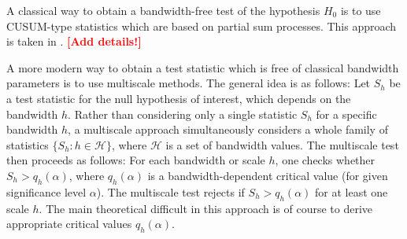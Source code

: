 \documentclass[a4paper,12pt]{article}
\begin{document}
A classical way to obtain a bandwidth-free test of the hypothesis $H_0$ is to use CUSUM-type statistics which are based on partial sum processes. This approach is taken in \cite{Hidalgo2014}. \textcolor{red}{\textbf{[Add details!]}}


A more modern way to obtain a test statistic which is free of classical bandwidth parameters is to use multiscale methods. The general idea is as follows: Let $S_h$ be a test statistic for the null hypothesis of interest, which depends on the bandwidth $h$. Rather than considering only a single statistic $S_h$ for a specific bandwidth $h$, a multiscale approach simultaneously considers a whole family of statistics $\{S_h: h \in \mathcal{H} \}$, where $\mathcal{H}$ is a set of bandwidth values. The multiscale test then proceeds as follows: For each bandwidth or scale $h$, one checks whether $S_h > q_h(\alpha)$, where $q_h(\alpha)$ is a bandwidth-dependent critical value (for given significance level $\alpha$). The multiscale test rejects if $S_h > q_h(\alpha)$ for at least one scale $h$. The main theoretical difficult in this approach is of course to derive appropriate critical values $q_h(\alpha)$. 
\end{document}
